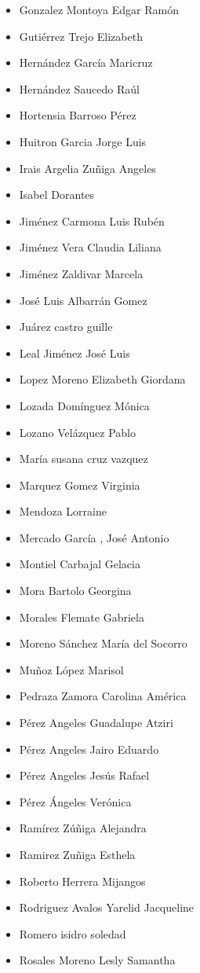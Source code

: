 \begin{spacing}{0.5}
\begin{paracol}{2}
\begin{itemize}
\item Gonzalez Montoya Edgar Ramón
\item Gutiérrez Trejo Elizabeth
\item Hernández García Maricruz
\item Hernández Saucedo Raúl
\item Hortensia Barroso Pérez
\item Huitron Garcia Jorge Luis
\item Irais Argelia Zuñiga Angeles
\item Isabel Dorantes
\item Jiménez Carmona Luis Rubén
\item Jiménez Vera Claudia Liliana
\item Jiménez Zaldivar Marcela
\item José Luis Albarrán Gomez
\item Juárez castro guille
\item Leal Jiménez José Luis
\item Lopez Moreno Elizabeth Giordana
\item Lozada Domínguez Mónica
\item Lozano Velázquez Pablo
\item María susana cruz vazquez
\item Marquez Gomez Virginia
\item Mendoza Lorraine
\item Mercado García , José Antonio
\item Montiel Carbajal Gelacia
\item Mora Bartolo Georgina
\item Morales Flemate Gabriela
\item Moreno Sánchez María del Socorro
\item Muñoz López Marisol
\item Pedraza Zamora Carolina América
\item Pérez Angeles Guadalupe Atziri
\item Pérez Angeles Jairo Eduardo
\item Pérez Angeles Jesús Rafael
\item Pérez Ángeles Verónica
\item Ramírez Zúñiga Alejandra
\item Ramirez Zuñiga Esthela
\item Roberto Herrera Mijangos
\item Rodriguez Avalos Yarelid Jacqueline
\item Romero isidro soledad
\item Rosales Moreno Lesly Samantha

\end{itemize}
\end{paracol}
\end{spacing}
